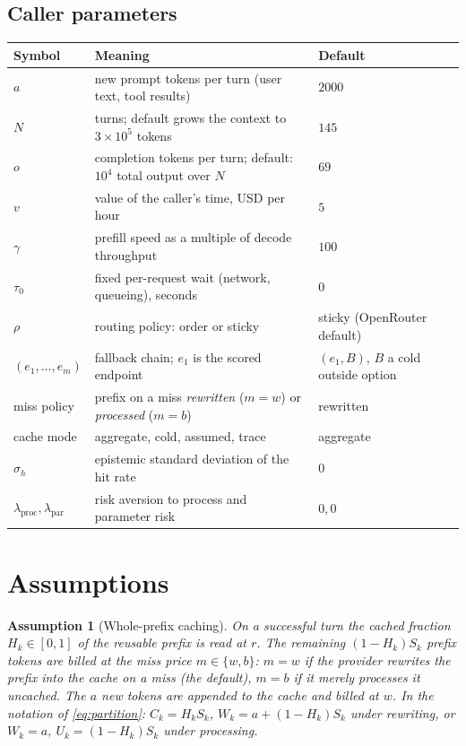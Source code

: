 \documentclass[11pt]{article}
\newtheorem{assumption}{Assumption}
\begin{document}
\subsection{Caller parameters}
\begin{center}\footnotesize
\begin{tabular}{@{}lll@{}}
\toprule
Symbol & Meaning & Default \\
\midrule
$a$ & new prompt tokens per turn (user text, tool results) & $2000$ \\
$N$ & turns; default grows the context to $3 \times 10^5$ tokens & $145$ \\
$o$ & completion tokens per turn; default: $10^4$ total output over $N$ & $69$ \\
$v$ & value of the caller's time, USD per hour & $5$ \\
$\gamma$ & prefill speed as a multiple of decode throughput & $100$ \\
$\tau_0$ & fixed per-request wait (network, queueing), seconds & $0$ \\
$\rho$ & routing policy: \textsf{order} or \textsf{sticky} & \textsf{sticky} (OpenRouter default) \\
$(e_1, \dots, e_m)$ & fallback chain; $e_1$ is the scored endpoint & $(e_1, B)$, $B$ a cold outside option \\
miss policy & prefix on a miss \emph{rewritten} ($m = w$) or \emph{processed} ($m = b$) & rewritten \\
cache mode & \textsf{aggregate}, \textsf{cold}, \textsf{assumed}, \textsf{trace} & \textsf{aggregate} \\
$\sigma_h$ & epistemic standard deviation of the hit rate & $0$ \\
$\lambda_{\text{proc}}, \lambda_{\text{par}}$ & risk aversion to process and parameter risk & $0, 0$ \\
\bottomrule
\end{tabular}
\end{center}

\section{Assumptions}

\begin{assumption}[Whole-prefix caching]\label{as:policy}
On a successful turn the cached fraction $H_k \in [0,1]$ of the reusable prefix
is read at $r$. The remaining $(1 - H_k) S_k$ prefix tokens are billed at the
miss price $m \in \{w, b\}$: $m = w$ if the provider rewrites the prefix into the
cache on a miss (the default), $m = b$ if it merely processes it uncached. The
$a$ new tokens are appended to the cache and billed at $w$. In the notation of
\eqref{eq:partition}: $C_k = H_k S_k$, $W_k = a + (1-H_k) S_k$ under rewriting,
or $W_k = a,\ U_k = (1-H_k) S_k$ under processing.
\end{assumption}
\end{document}
